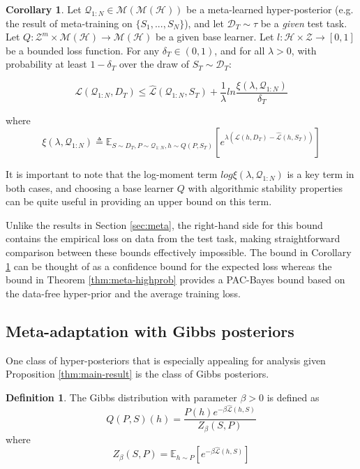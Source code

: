 \documentclass{article}
\theoremstyle{definition}
\newtheorem{defn}{Definition}[section]
\newtheorem{corollary}{Corollary}[section]
\newcommand{\Expect}[2]{\mathbb{E}_{#1}\left [#2 \right ]}
\begin{document}
\begin{corollary} \label{thm:corollary-base}
	Let $\mathcal{Q}_{1:N}\in \mathcal{M}(\mathcal{M}(\mathcal{H}))$ be a meta-learned hyper-posterior (e.g. the result of meta-training on $\{S_1,...,S_N\}$), and let $\mathcal{D}_T\sim \tau$ be a \emph{given} test task. Let $Q: \mathcal{Z}^m\times\mathcal{M}(\mathcal{H})\rightarrow \mathcal{M}(\mathcal{H})$ be a given base learner. Let $l: \mathcal{H}\times \mathcal{Z}\rightarrow [0, 1]$ be a bounded loss function.
	For any $\delta_T \in (0,1)$, and for all $\lambda>0$, with probability at least $1-\delta_T$ over the draw of $S_T\sim \mathcal{D}_T$:
	
	$$\mathcal{L}(\mathcal{Q}_{1:N}, D_T) \leq \hat{\mathcal{L}}(\mathcal{Q}_{1:N}, S_T)
	+\frac{1}{\lambda}ln\frac{\xi(\lambda,\mathcal{Q}_{1:N})}{\delta_T}$$
	
	where 
	$$\xi(\lambda,\mathcal{Q}_{1:N})\triangleq \Expect{S\sim D_T, P\sim \mathcal{Q}_{1:N}, h\sim Q(P,S_T)}{e^{\lambda\left (\mathcal{L}(h, D_T)-\hat{\mathcal{L}}(h, S_T)\right )}}$$
\end{corollary}

It is important to note that the log-moment term $log\xi(\lambda,\mathcal{Q}_{1:N})$ is a key term in both cases, and choosing a base learner $Q$ with algorithmic stability properties can be quite useful in providing an upper bound on this term.

Unlike the results in Section \ref{sec:meta}, the right-hand side for this bound contains the empirical loss on data from the test task, making straightforward comparison between these bounds effectively impossible. The bound in Corollary \ref{thm:corollary-base} can be thought of as a confidence bound for the expected loss whereas the bound in Theorem \ref{thm:meta-highprob} provides a PAC-Bayes bound based on the data-free hyper-prior and the average training loss.

\subsection{Meta-adaptation with Gibbs posteriors} \label{sec:adapt-gibbs}

One class of hyper-posteriors that is especially appealing for analysis given Proposition \ref{thm:main-result} is the class of Gibbs posteriors.

\begin{defn} \label{defn:Gibbs}
	The Gibbs distribution with parameter $\beta>0$ is defined as $$Q(P,S)(h)=\frac{P(h)e^{-\beta \hat{\mathcal{L}}(h,S)}}{Z_\beta(S,P)}$$ 
	where 
	$$Z_\beta(S,P)=\Expect{h\sim P}{e^{-\beta\hat{\mathcal{L}}(h,S)}}$$
\end{defn}
\end{document}
